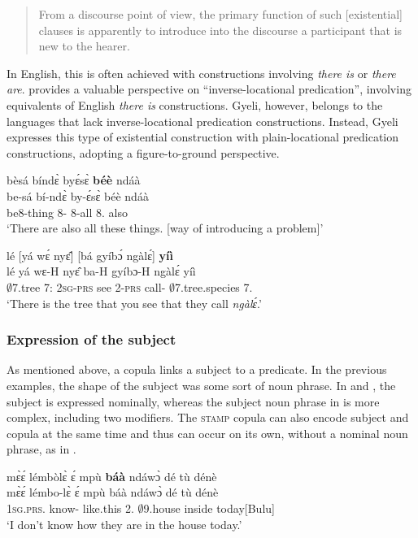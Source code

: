 \begin{quote} From a discourse point of view, the primary function of such [existential] clauses is apparently to introduce into the discourse a participant that is new to the hearer. \end{quote}
In English, this is often achieved with constructions involving {\itshape there is} or {\itshape there are}. \citet{creissels2019} provides a valuable perspective on ``inverse-locational predication'', involving equivalents of English {\itshape there is} constructions. Gyeli, however, belongs to the languages that lack inverse-locational predication constructions. Instead, Gyeli expresses this type of existential construction with plain-locational predication constructions, adopting a figure-to-ground perspective. 

\ea \label{ID4}
  \glll bèsá bíndɛ̀ byɛ́sɛ̀ {\bfseries béè} ndáà \\
       be-sá bí-ndɛ̀ by-ɛ́sɛ̀ béè ndáà \\
        be8-thing 8-{\ANA} 8-all 8.{\COP} also\\
    \trans `There are also all these things. [way of introducing a problem]'
\z

\ea \label{ID5}
  \glll lé [yá wɛ́ nyɛ̂]\textsubscript{\REL} [bá gyíbɔ́ ngàlɛ́]\textsubscript{\REL} {\bfseries yíì} \\
        lé {\db}yá wɛ-H nyɛ̂ {\db}ba-H gyíbɔ-H ngàlɛ́ yíì \\
       $\emptyset$7.tree {\db}7:{\ATT} 2\textsc{sg}-\textsc{prs} see {\db}2-\textsc{prs} call-{\R} $\emptyset$7.tree.species 7.{\COP}   \\
    \trans `There is the tree that you see that they call {\itshape ngàlɛ́}.'
\z




\subsubsection*{Expression of the subject} As mentioned above, a copula links a subject to a predicate. In the previous examples, the shape of the subject was some sort of noun phrase. In  and , the subject is expressed nominally, whereas the subject noun phrase in  is more complex, including two modifiers. The \textsc{stamp} copula can also encode subject and copula at the same time and thus can occur on its own, without a nominal noun phrase, as in .


\ea \label{ID6}
  \glll mɛ̀ɛ́ lémbòlɛ̀ ɛ́ mpù {\bfseries báà} ndáwɔ̀ dé tù dénè \\
      mɛ̀ɛ́ lémbo-lɛ̀ ɛ́ mpù báà ndáwɔ̀ dé tù dénè \\
        1\textsc{sg}.\textsc{prs}.{\NEG} know-{\NEG} {\LOC} like.this 2.{\COP} $\emptyset$9.house {\LOC} inside today[Bulu]  \\
    \trans `I don't know how they are in the house today.'
\z



